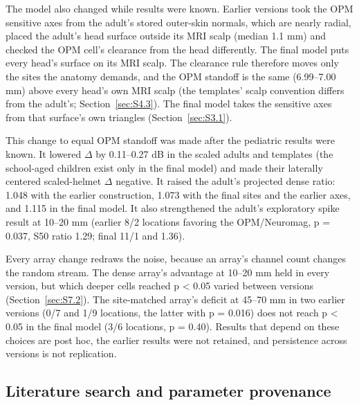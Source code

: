 \documentclass[preprint,12pt,authoryear,a4paper]{elsarticle}
\begin{document}
The model also changed while results were known. Earlier versions took the OPM sensitive axes from the adult's stored outer-skin normals, which are nearly radial, placed the adult's head surface outside its MRI scalp (median 1.1 mm) and checked the OPM cell's clearance from the head differently. The final model puts every head's surface on its MRI scalp. The clearance rule therefore moves only the sites the anatomy demands, and the OPM standoff is the same (6.99–7.00 mm) above every head's own MRI scalp (the templates' scalp convention differs from the adult's; Section~\ref{sec:S4.3}). The final model takes the sensitive axes from that surface's own triangles (Section~\ref{sec:S3.1}).

This change to equal OPM standoff was made after the pediatric results were known. It lowered $\Delta$ by 0.11–0.27 dB in the scaled adults and templates (the school-aged children exist only in the final model) and made their laterally centered scaled-helmet $\Delta$ negative. It raised the adult's projected dense ratio: 1.048 with the earlier construction, 1.073 with the final sites and the earlier axes, and 1.115 in the final model. It also strengthened the adult's exploratory spike result at 10–20 mm (earlier 8/2 locations favoring the OPM/Neuromag, p = 0.037, S50 ratio 1.29; final 11/1 and 1.36).

Every array change redraws the noise, because an array's channel count changes the random stream. The dense array's advantage at 10–20 mm held in every version, but which deeper cells reached p < 0.05 varied between versions (Section~\ref{sec:S7.2}). The site-matched array's deficit at 45–70 mm in two earlier versions (0/7 and 1/9 locations, the latter with p = 0.016) does not reach p < 0.05 in the final model (3/6 locations, p = 0.40). Results that depend on these choices are post hoc, the earlier results were not retained, and persistence across versions is not replication.

\subsection{Literature search and parameter provenance}\label{sec:S8.3}
\end{document}
